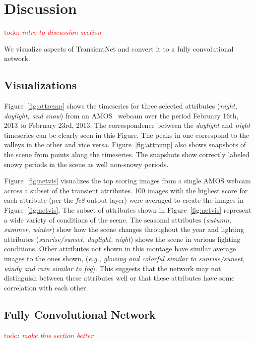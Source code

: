 \documentclass[10pt,twocolumn,letterpaper]{article}
\newcommand{\todo}[1]{\textcolor{red}{todo: {\em #1}}}
\newcommand{\figref}[1]{Figure~\ref{fig:#1}}
\begin{document}
\section{Discussion}
\todo{intro to discussion section}

We visualize aspects of TransientNet and convert it to a fully convolutional
network. 

\subsection{Visualizations}
\indent
\figref{attrcmp} shows the timeseries for three selected attributes
(\textit{night, daylight, and snow}) from an AMOS~\cite{jacobs07amos} webcam
over the period February 16th, 2013 to February 23rd, 2013.  The correspondence
between the \textit{daylight} and \textit{night} timeseries can be clearly seen
in this Figure.  The peaks in one correspond to the valleys in the other and
vice versa.  \figref{attrcmp} also shows snapshots of the scene from points
along the timeseries.  The snapshots show correctly labeled snowy periods in
the scene as well non-snowy periods.

\figref{netvis} visualizes the top scoring images from a single
AMOS webcam across a subset of the transient attributes.
100 images with the highest score for each attribute (per the \textit{fc8}
output layer) were averaged to create the images in \figref{netvis}.  The
subset of attributes shown in \figref{netvis} represent a wide variety of
conditions of the scene.  The seasonal attributes (\textit{autumn, summer,
winter}) show how the scene changes throughout the year and lighting attributes
(\textit{sunrise/sunset, daylight, night}) shows the scene in various lighting
conditions.  Other attributes not shown in this montage have similar average
images to the ones shown, (\textit{e.g., glowing and colorful similar to
sunrise/sunset, windy and rain similar to fog}).  This suggests that the
network may not distinguish between these attributes well or that these
attributes have some correlation with each other.

\subsection{Fully Convolutional Network}
\todo{make this section better}
\end{document}
